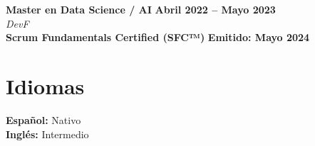 \documentclass[11pt]{article}
\begin{document}
\textbf{Master en Data Science / AI} \hfill \textbf{Abril 2022 – Mayo 2023}\\
\textit{DevF}\\
\textbf{Scrum Fundamentals Certified (SFC™)} \hfill \textbf{Emitido: Mayo 2024}\\

\section{Idiomas}
\textbf{Español:} Nativo\\
\textbf{Inglés:} Intermedio
\end{document}
